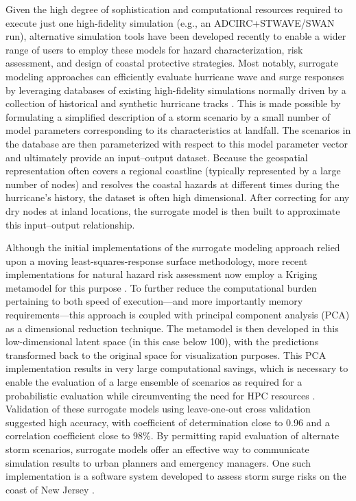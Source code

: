 Given the high degree of sophistication and computational resources required to execute just one high-fidelity simulation (e.g., an ADCIRC+STWAVE/SWAN run), alternative simulation tools have been developed recently to enable a wider range of users to employ these models for hazard characterization, risk assessment, and design of coastal protective strategies. Most notably, surrogate modeling approaches can efficiently evaluate hurricane wave and surge responses by leveraging databases of existing high-fidelity simulations normally driven by a collection of historical and synthetic hurricane tracks \citep{usace2015north}. This is made possible by formulating a simplified description of a storm scenario by a small number of model parameters corresponding to its characteristics at landfall. The scenarios in the database are then parameterized with respect to this model parameter vector and ultimately provide an input--output dataset. Because the geospatial representation often covers a regional coastline (typically represented by a large number of nodes) and resolves the coastal hazards at different times during the hurricane's history, the dataset is often high dimensional. After correcting for any dry nodes at inland locations, the surrogate model is then built to approximate this input--output relationship. 

Although the initial implementations of the surrogate modeling approach relied upon a moving least-squares-response surface methodology, more recent implementations for natural hazard risk assessment now employ a Kriging metamodel for this purpose \citep{jia2013kriging}. To further reduce the computational burden pertaining to both speed of execution---and more importantly memory requirements---this approach is coupled with principal component analysis (PCA) as a dimensional reduction technique. The metamodel is then developed in this low-dimensional latent space (in this case below 100), with the predictions transformed back to the original space for visualization purposes. This PCA implementation results in very large computational savings, which is necessary to enable the evaluation of a large ensemble of scenarios as required for a probabilistic evaluation while circumventing the need for HPC resources \citep{jia2013kriging}. Validation of these surrogate models using leave-one-out cross validation \citep{taflanidis2017advances} suggested high accuracy, with coefficient of determination close to 0.96 and a correlation coefficient close to 98\%. By permitting rapid evaluation of alternate storm scenarios, surrogate models offer an effective way to communicate simulation results to urban planners and emergency managers. One such implementation is a software system developed to assess storm surge risks on the coast of New Jersey \citep{njcoast2018implementation}.


